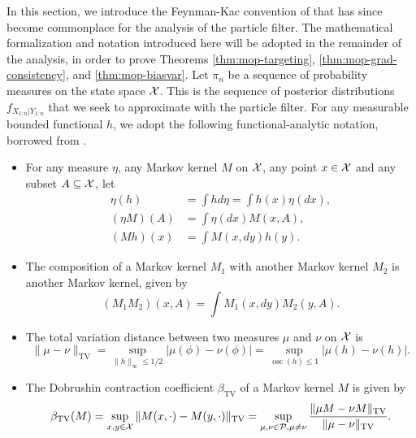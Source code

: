 

In this section, we introduce the Feynman-Kac convention of \cite{delMoral04} that has since become commonplace \cite{karjalainen23} for the analysis of the particle filter. The mathematical formalization and notation introduced here will be adopted in the remainder of the analysis, in order to prove Theorems \ref{thm:mop-targeting}, \ref{thm:mop-grad-consistency}, and \ref{thm:mop-biasvar}. Let $\pi_n$ be a sequence of probability measures on the state space ${\mathcal{X}}$. This is the sequence of posterior distributions $f_{X_{1:n}|Y_{1:n}}$ that we seek to approximate with the particle filter. For any measurable bounded functional $h$, we adopt the following functional-analytic notation, borrowed from \cite{delMoral04, chopin20, karjalainen23}. 

\begin{itemize}
\item For any measure $\eta$, any Markov kernel $M$ on ${\mathcal{X}}$, any point $x \in {\mathcal{X}}$ and any subset $A \subseteq {\mathcal{X}}$, let 
\begin{align*}
    \eta(h) &= \int h d\eta = \int h(x) \eta(dx), \\(\eta M)(A) &= \int \eta(dx)M(x,A), \\
    (Mh)(x) &= \int M(x, dy) h(y).
\end{align*}
\item The composition of a Markov kernel $M_1$ with another Markov kernel $M_2$ is another Markov kernel, given by 
$$(M_1M_2)(x, A) = \int M_1(x, dy) M_2(y, A).$$
\item The total variation distance between two measures $\mu$ and $\nu$ on ${\mathcal{X}}$ is
$$\|\mu-\nu\|_{\mathrm{TV}}=\sup _{\|h\|_{\infty} \leq 1 / 2}|\mu(\phi)-\nu(\phi)|=\sup _{\operatorname{osc}(h) \leq 1}|\mu(h)-\nu(h)|.$$
\item The Dobrushin contraction coefficient $\beta_{\text{TV}}$ of a Markov kernel $M$ is given by
$$\beta_{\mathrm{TV}}(M)=\sup _{x, y \in {\mathcal{X}}}\|M(x, \cdot)-M(y, \cdot)\|_{\mathrm{TV}}=\sup _{\mu, \nu \in \mathcal{P}, \mu \neq \nu} \frac{\|\mu M-\nu M\|_{\mathrm{TV}}}{\|\mu-\nu\|_{\mathrm{TV}}}.$$
\end{itemize}